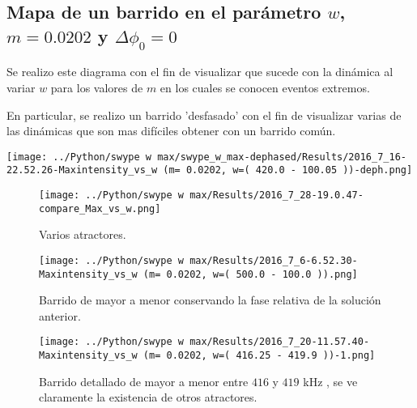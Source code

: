 		
	
	\subsection{Mapa de un barrido en el parámetro $w$, $m=0.0202$ y $\Delta \phi_0=0$}			 			
	Se realizo este diagrama con el fin de visualizar que sucede con la dinámica al variar $w$ para los valores de $m$ en los cuales se conocen eventos extremos.
	
	En particular, se realizo un barrido 'desfasado'  con el fin de visualizar varias de las dinámicas que son mas difíciles obtener con un barrido común.
	
	\begin{minipage}{0.7\textwidth}
		\centering
		\texttt{[image: ../Python/swype w max/swype\_w\_max-dephased/Results/2016\_7\_16-22.52.26-Maxintensity\_vs\_w (m= 0.0202, w=( 420.0 - 100.05 ))-deph.png]}
	\end{minipage}	
	
	
	\begin{figure}[htp]
		\begin{center}
			\texttt{[image: ../Python/swype w max/Results/2016\_7\_28-19.0.47-compare\_Max\_vs\_w.png]}
		\end{center}
		\caption{Varios atractores.}
		\label{202 colores}
	\end{figure}
	
	
	\begin{figure}[htp]
		\begin{center}
			\texttt{[image: ../Python/swype w max/Results/2016\_7\_6-6.52.30-Maxintensity\_vs\_w (m= 0.0202, w=( 500.0 - 100.0 )).png]}
		\end{center}
		\caption{Barrido de mayor a menor conservando la fase relativa de la solución anterior.}
	\end{figure}
	
	
	
	\begin{figure}[htp]
		\begin{center}
			\texttt{[image: ../Python/swype w max/Results/2016\_7\_20-11.57.40-Maxintensity\_vs\_w (m= 0.0202, w=( 416.25 - 419.9 ))-1.png]}
		\end{center}
		\caption{Barrido detallado de mayor a menor entre $416$ y $419$ kHz , se ve claramente la existencia de otros atractores.}
	\end{figure}
	
